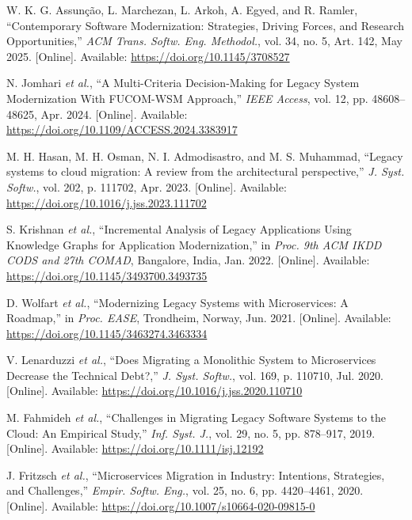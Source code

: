 \documentclass[12pt]{article}
\begin{document}
\begin{thebibliography}{99}

W. K. G. Assun\c{c}\~{a}o, L. Marchezan, L. Arkoh, A. Egyed, and R. Ramler, “Contemporary Software Modernization: Strategies, Driving Forces, and Research Opportunities,” \textit{ACM Trans. Softw. Eng. Methodol.}, vol. 34, no. 5, Art. 142, May 2025. [Online]. Available: \url{https://doi.org/10.1145/3708527}

N. Jomhari \textit{et al.}, “A Multi-Criteria Decision-Making for Legacy System Modernization With FUCOM-WSM Approach,” \textit{IEEE Access}, vol. 12, pp. 48608–48625, Apr. 2024. [Online]. Available: \url{https://doi.org/10.1109/ACCESS.2024.3383917}

M. H. Hasan, M. H. Osman, N. I. Admodisastro, and M. S. Muhammad, “Legacy systems to cloud migration: A review from the architectural perspective,” \textit{J. Syst. Softw.}, vol. 202, p. 111702, Apr. 2023. [Online]. Available: \url{https://doi.org/10.1016/j.jss.2023.111702}

S. Krishnan \textit{et al.}, “Incremental Analysis of Legacy Applications Using Knowledge Graphs for Application Modernization,” in \textit{Proc. 9th ACM IKDD CODS and 27th COMAD}, Bangalore, India, Jan. 2022. [Online]. Available: \url{https://doi.org/10.1145/3493700.3493735}

D. Wolfart \textit{et al.}, “Modernizing Legacy Systems with Microservices: A Roadmap,” in \textit{Proc. EASE}, Trondheim, Norway, Jun. 2021. [Online]. Available: \url{https://doi.org/10.1145/3463274.3463334}

V. Lenarduzzi \textit{et al.}, “Does Migrating a Monolithic System to Microservices Decrease the Technical Debt?,” \textit{J. Syst. Softw.}, vol. 169, p. 110710, Jul. 2020. [Online]. Available: \url{https://doi.org/10.1016/j.jss.2020.110710}

M. Fahmideh \textit{et al.}, “Challenges in Migrating Legacy Software Systems to the Cloud: An Empirical Study,” \textit{Inf. Syst. J.}, vol. 29, no. 5, pp. 878–917, 2019. [Online]. Available: \url{https://doi.org/10.1111/isj.12192}

J. Fritzsch \textit{et al.}, “Microservices Migration in Industry: Intentions, Strategies, and Challenges,” \textit{Empir. Softw. Eng.}, vol. 25, no. 6, pp. 4420–4461, 2020. [Online]. Available: \url{https://doi.org/10.1007/s10664-020-09815-0}


\end{thebibliography}
\end{document}
